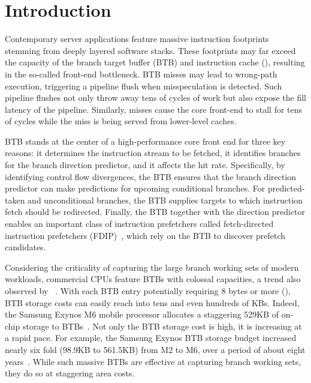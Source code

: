 \section{Introduction}
\label{hpca:sec:intro}

Contemporary server applications feature massive instruction footprints stemming from deeply layered software stacks. These footprints may far exceed the capacity of the branch target buffer (BTB) and instruction cache (), resulting in the so-called front-end bottleneck. BTB misses may lead to wrong-path execution, triggering a pipeline flush when misspeculation is detected. Such pipeline flushes not only throw away tens of cycles of work but also expose the fill latency of the pipeline. Similarly,  misses cause the core front-end to stall for tens of cycles while the miss is being served from lower-level caches. 

BTB stands at the center of a high-performance core front end for three key reasons: it determines the instruction stream to be fetched, it identifies branches for the branch direction predictor, and it affects the  hit rate. Specifically, by identifying control flow divergences, the BTB ensures that the branch direction predictor can make predictions for upcoming conditional branches. For predicted-taken and unconditional branches, the BTB supplies targets to which instruction fetch should be redirected. Finally, the BTB together with the direction predictor enables an important class of instruction prefetchers called fetch-directed instruction prefetchers (FDIP)~\cite{fdip, boomerang, shotgun, shotgunTOCS}, which rely on the BTB to discover  prefetch candidates. 

Considering the criticality of capturing the large branch working sets of modern workloads, commercial CPUs feature BTBs with colossal capacities, a trend also observed by ~\cite{rebase}. With each BTB entry potentially requiring 8 bytes or more (), BTB storage costs can easily reach into tens and even hundreds of KBs. Indeed, the Samsung Exynos M6 mobile processor allocates a staggering 529KB of on-chip storage to BTBs~\cite{exynos}. Not only the BTB storage cost is high, it is increasing at a rapid pace. For example, the Samsung Exynos BTB storage budget increased nearly six fold (98.9KB to 561.5KB) from M2 to M6, over a period of about eight years~\cite{exynos}. While such massive BTBs are effective at capturing branch working sets, they do so at staggering area costs.

